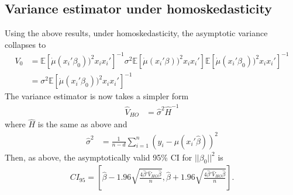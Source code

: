 \documentclass[12pt]{article}
\newcommand{\E}{\mathbb{E}}
\newcommand{\mtx}[1]{\ensuremath{\bm{\mathit{#1}}}}
\begin{document}
\subsection{Variance estimator under homoskedasticity}
Using the above results, under homoskedasticity, the asymptotic variance collapses to
\begin{align*}
\mtx{V}_0 &= \E[\dot{\mu}(\mtx{x}_i'\mtx{\beta}_0))^2\mtx{x}_i\mtx{x}_i']^{-1} \sigma^2 \E[\dot{\mu}(\mtx{x}_i'\mtx{\beta}))^2\mtx{x}_i\mtx{x}_i'] \E[\dot{\mu}(\mtx{x}_i'\mtx{\beta}_0))^2\mtx{x}_i\mtx{x}_i']^{-1}\\
&=\sigma^2\E[\dot{\mu}(\mtx{x}_i'\mtx{\beta}_0))^2\mtx{x}_i\mtx{x}_i']^{-1}
\end{align*}
The variance estimator is now takes a simpler form
\begin{align*}
\widehat{\mtx{V}}_{HO} &= \hat{\sigma}^2 \hat{H}^{-1}
\end{align*}
where $\hat{H}$ is the same as above and
\begin{align*}
\hat{\sigma}^2 &= \frac{1}{n-d} \sum_{i=1}^n (y_i-\mu(\mtx{x}_i'\hat{\mtx{\beta}}))^2
\end{align*}
Then, as above, the asymptotically valid 95\% CI for $|| \mtx{\beta}_0 ||^2$ is
\begin{align*}
CI_{95} = \left[\hat{\mtx{\beta}} - 1.96 \sqrt{\frac{4\hat{\mtx{\beta}}'\widehat{\mtx{V}}_{HO}\hat{\mtx{\beta}}}{n}},\hat{\mtx{\beta}} + 1.96 \sqrt{\frac{4\hat{\mtx{\beta}}'\widehat{\mtx{V}}_{HO}\hat{\mtx{\beta}}}{n}}\right].
\end{align*}
\end{document}
